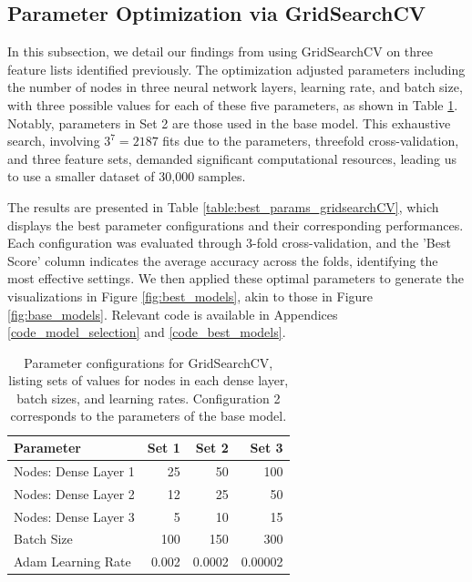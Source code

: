 \documentclass[]{article}
\begin{document}
\clearpage

\subsection{Parameter Optimization via GridSearchCV}

In this subsection, we detail our findings from using GridSearchCV on three feature lists identified previously. The optimization adjusted parameters including the number of nodes in three neural network layers, learning rate, and batch size, with three possible values for each of these five parameters, as shown in Table \ref{table:gridsearchCV_params}. Notably, parameters in Set 2 are those used in the base model. This exhaustive search, involving $3^7 = 2187$ fits due to the parameters, threefold cross-validation, and three feature sets, demanded significant computational resources, leading us to use a smaller dataset of 30,000 samples.

The results are presented in Table \ref{table:best_params_gridsearchCV}, which displays the best parameter configurations and their corresponding performances. Each configuration was evaluated through 3-fold cross-validation, and the 'Best Score' column indicates the average accuracy across the folds, identifying the most effective settings. We then applied these optimal parameters to generate the visualizations in Figure \ref{fig:best_models}, akin to those in Figure \ref{fig:base_models}. Relevant code is available in Appendices \ref{code_model_selection} and \ref{code_best_models}.

\begin{table}[h!]
	\centering
	\begin{tabular}{@{}lrrr@{}}
		\toprule
		Parameter            & Set 1  & Set 2  & Set 3  \\ \midrule
		Nodes: Dense Layer 1 & 25     & 50     & 100    \\
		Nodes: Dense Layer 2 & 12     & 25     & 50     \\
		Nodes: Dense Layer 3 & 5      & 10     & 15     \\
		Batch Size           & 100    & 150    & 300    \\
		Adam Learning Rate   & 0.002  & 0.0002 & 0.00002 \\
		\bottomrule   
	\end{tabular}
	\caption{Parameter configurations for GridSearchCV, listing sets of values for nodes in each dense layer, batch sizes, and learning rates. Configuration 2 corresponds to the parameters of the base model.} 
	\label{table:gridsearchCV_params}
\end{table}
\end{document}
